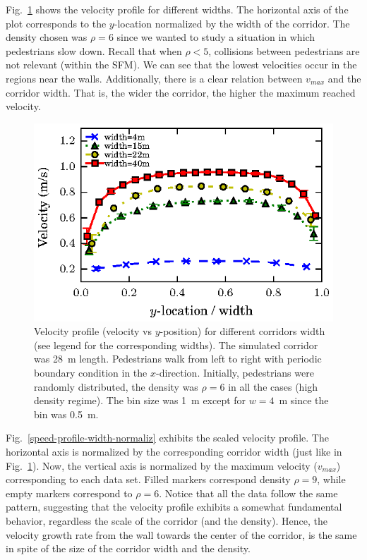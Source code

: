 Fig.~\ref{speed-profile-multi_width} shows the velocity profile for different widths. The horizontal axis of the plot corresponds to the $y$-location normalized by the width of the corridor. The density chosen was $\rho = 6$ since we wanted to study a situation in which pedestrians slow down. Recall that when $\rho<5$, collisions between pedestrians are not relevant (within the SFM). We can see that the lowest velocities occur in the regions near the walls. Additionally, there is a clear relation between $v_{max}$ and the corridor width. That is, the wider the corridor, the higher the maximum reached velocity.\\


\begin{figure}[htbp!]
\includegraphics[width=\columnwidth]
{plots/v(y)_multi_width.eps}
\caption{\label{speed-profile-multi_width} Velocity profile (velocity vs $y$-position) for different corridors width (see legend for the corresponding widths). The simulated corridor was 28~m length. Pedestrians walk from left to right with periodic boundary condition in the $x$-direction. Initially, pedestrians were randomly distributed, the density was $\rho = 6$ in all the cases (high density regime). The bin size was 1~m except for $w=4$~m since the bin was 0.5~m.}
\end{figure}


Fig.~\ref{speed-profile-width-normaliz} exhibits the scaled velocity profile. The horizontal axis is normalized by the corresponding corridor width (just like in Fig.~\ref{speed-profile-multi_width}). Now, the vertical axis is normalized by the maximum velocity ($v_{max}$) corresponding to each data set. Filled markers correspond density $\rho=9$, while empty markers correspond to $\rho=6$. Notice that all the data follow the same  pattern, suggesting that the velocity profile exhibits a somewhat fundamental behavior, regardless the scale of the corridor (and the density). Hence, the velocity growth rate from the wall towards the center of the corridor, is the same in spite of the size of the corridor width and the density. \\

